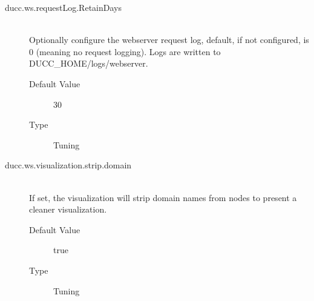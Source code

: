 \begin{description}
        \item[ducc.ws.requestLog.RetainDays] \hfill \\
          Optionally configure the webserver request log, default, if not configured, is 0 (meaning no request logging).
          Logs are written to DUCC\_HOME/logs/webserver.
          \begin{description}
            \item[Default Value] 30
            \item[Type] Tuning
          \end{description}

        \item[ducc.ws.visualization.strip.domain] \hfill \\
          If set, the visualization will strip domain names from nodes to present a cleaner visualization.
          \begin{description}
            \item[Default Value] true
            \item[Type] Tuning
          \end{description}

      \end{description}  
            
    
